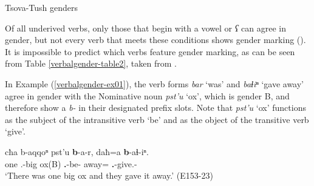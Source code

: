 \begin{table}
	\begin{floatrow}
	{\caption{Tsova-Tush genders}\label{verbalgender-table1}}
	
	{\caption{Tsova-Tush verbs with and without gender marking}\label{verbalgender-table2}}
	\end{floatrow}
\end{table}

Of all underived verbs, only those that begin with a vowel or \textit{ʕ} can agree in gender, but not every verb that meets these conditions shows gender marking (\cites{haukharris}[278]{harris09}). It is impossible to predict which verbs feature gender marking, as can be seen from Table \ref{verbalgender-table2}, taken from \textcite{haukharris}.

In Example (\ref{verbalgender-ex01}), the verb forms \textit{bar} `was’ and \textit{baɬiⁿ} `gave away’ agree in gender with the Nominative noun \textit{pst'u} `ox', which is gender B, and therefore show a \textit{b-} in their designated prefix slots. Note that \textit{pst'u} `ox' functions as the subject of the intransitive verb `be' and as the object of the transitive verb `give'.

\begin{exe}
	\ex\label{verbalgender-ex01}
	\gll cħa b-aqqoⁿ pst'u \textbf{b}-a-r, daħ=a \textbf{b}-aɬ-iⁿ. \\
	one	{\B}.{\Sg}-big ox(B) \textbf{{\B}.{\Sg}}-be-{\Imprf} away={\Add} \textbf{{\B}.{\Sg}}-give.{\Pfv}-{\Aor} \\
	\trans ‘There was one big ox and they gave it away.’
	\hfill (E153-23)
\end{exe}

